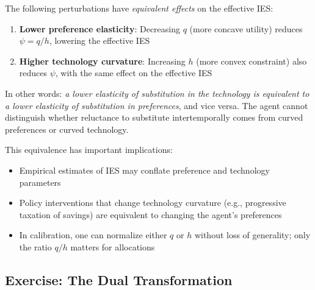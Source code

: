 \begin{calloutnote}
The following perturbations have \emph{equivalent effects} on the effective IES:
\begin{enumerate}[label=(\roman*)]
    \item \textbf{Lower preference elasticity}: Decreasing $q$ (more concave utility) reduces $\psi = q/h$, lowering the effective IES
    \item \textbf{Higher technology curvature}: Increasing $h$ (more convex constraint) also reduces $\psi$, with the same effect on the effective IES
\end{enumerate}
In other words: \emph{a lower elasticity of substitution in the technology is equivalent to a lower elasticity of substitution in preferences}, and vice versa. The agent cannot distinguish whether reluctance to substitute intertemporally comes from curved preferences or curved technology.
\end{calloutnote}

\begin{remark}[Interpretation]
This equivalence has important implications:
\begin{itemize}[leftmargin=*]
    \item Empirical estimates of IES may conflate preference and technology parameters
    \item Policy interventions that change technology curvature (e.g., progressive taxation of savings) are equivalent to changing the agent's preferences
    \item In calibration, one can normalize either $q$ or $h$ without loss of generality; only the ratio $q/h$ matters for allocations
\end{itemize}
\end{remark}

\subsection{Exercise: The Dual Transformation}
\label{subsec:exercise-dual}

